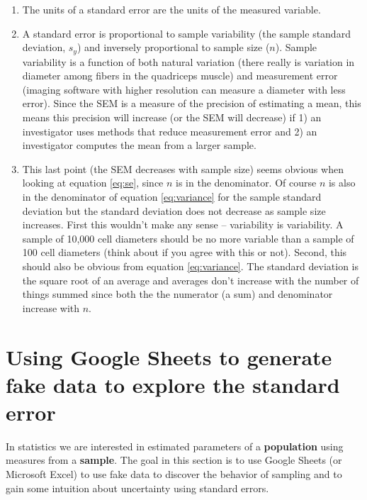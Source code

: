 \documentclass[]{book}
\providecommand{\tightlist}{%
  \setlength{\itemsep}{0pt}\setlength{\parskip}{0pt}}
\begin{document}
\begin{enumerate}
\def\labelenumi{\arabic{enumi}.}
\tightlist
\item
  The units of a standard error are the units of the measured variable.
\item
  A standard error is proportional to sample variability (the sample standard deviation, \(s_y\)) and inversely proportional to sample size (\(n\)). Sample variability is a function of both natural variation (there really is variation in diameter among fibers in the quadriceps muscle) and measurement error (imaging software with higher resolution can measure a diameter with less error). Since the SEM is a measure of the precision of estimating a mean, this means this precision will increase (or the SEM will decrease) if 1) an investigator uses methods that reduce measurement error and 2) an investigator computes the mean from a larger sample.
\item
  This last point (the SEM decreases with sample size) seems obvious when looking at equation \eqref{eq:se}, since \(n\) is in the denominator. Of course \(n\) is also in the denominator of equation \eqref{eq:variance} for the sample standard deviation but the standard deviation does not decrease as sample size increases. First this wouldn't make any sense -- variability is variability. A sample of 10,000 cell diameters should be no more variable than a sample of 100 cell diameters (think about if you agree with this or not). Second, this should also be obvious from equation \eqref{eq:variance}. The standard deviation is the square root of an average and averages don't increase with the number of things summed since both the the numerator (a sum) and denominator increase with \(n\).
\end{enumerate}

\hypertarget{using-google-sheets-to-generate-fake-data-to-explore-the-standard-error}{%
\section{Using Google Sheets to generate fake data to explore the standard error}\label{using-google-sheets-to-generate-fake-data-to-explore-the-standard-error}}

In statistics we are interested in estimated parameters of a \textbf{population} using measures from a \textbf{sample}. The goal in this section is to use Google Sheets (or Microsoft Excel) to use fake data to discover the behavior of sampling and to gain some intuition about uncertainty using standard errors.
\end{document}
